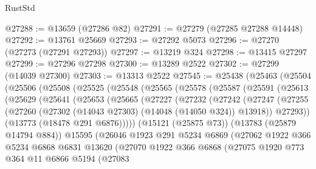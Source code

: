 \begin{lexlean}{RustStd}
\begin{coremodule}
@27288 := @13659 (@27286 @82)
@27291 := @27279 (@27285 @27288 @14448)
@27292 := @13761 @25669
@27293 := @27292 @5073
@27296 := @27270 (@27273 (@27291 @27293))
@27297 := @13219 @324
@27298 := @13415 @27297
@27299 := @27296 @27298
@27300 := @13289 @2522
@27302 := @27299 (@14039 @27300)
@27303 := @13313 @2522
@27545 := @25438
    (@25463
      (@25504
        (@25506
          (@25508
            (@25525
              (@25548
                (@25565
                  (@25578
                    (@25587
                      (@25591
                        (@25613
                          (@25629
                            (@25641
                              (@25653
                                (@25665
                                  (@27227
                                    (@27232
                                      (@27242
                                        (@27247
                                          (@27255
                                            (@27260
                                              (@27302
                                                (@14043 @27303)
                                                (@14048 (@14050 @324))
                                                @13918))
                                            @27293))
                                        (@13773 (@18478 @291 @6876)))))
                                  (@15121 (@25875 @73))
                                  (@13783 (@25879 @14794 @884))
                                  @15595
                                  (@26046
                                    @1923
                                    @291
                                    @5234
                                    @6869
                                    (@27062
                                      @1922
                                      @366
                                      @5234
                                      @6868
                                      @6831
                                      @13620
                                      (@27070
                                        @1922
                                        @366
                                        @6868
                                        (@27075
                                          @1920
                                          @773
                                          @364
                                          @11
                                          @6866
                                          @5194
                                          (@27083

\end{coremodule}
\end{lexlean}
